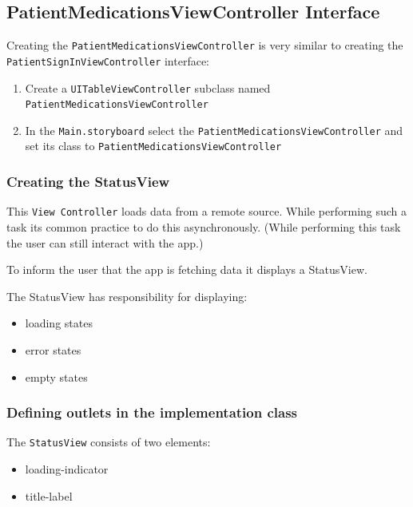\documentclass{article}
\begin{document}
\subsection{PatientMedicationsViewController Interface}\label{step-6.1-implementing-patientmedicationsviewcontroller---patientmedicationsviewcontroller-interface}

Creating the \texttt{PatientMedicationsViewController} is very similar
to creating the \texttt{PatientSignInViewController} interface:
\begin{enumerate}
  \item
    Create a \texttt{UITableViewController} subclass named \texttt{PatientMedicationsViewController}
  \item
    In the \texttt{Main.storyboard} select the \texttt{PatientMedicationsViewController} and set its class to \texttt{PatientMedicationsViewController}
\end{enumerate}


\subsubsection{Creating the StatusView}\label{creating-the-statusview}

This \texttt{View\ Controller} loads data from a remote source. While
performing such a task its common practice to do this asynchronously.
(While performing this task the user can still interact with the app.)

To inform the user that the app is fetching data it displays a
StatusView.

The StatusView has responsibility for displaying:
\begin{itemize}
  \item
    loading states
  \item
    error states
  \item
    empty states
\end{itemize}

\subsubsection{Defining outlets in the implementation class}\label{step6:define-the-outlets-in-the-implementation.}

The \texttt{StatusView} consists of two elements:

\begin{itemize}
  \item
    loading-indicator
  \item
    title-label
\end{itemize}
\end{document}
